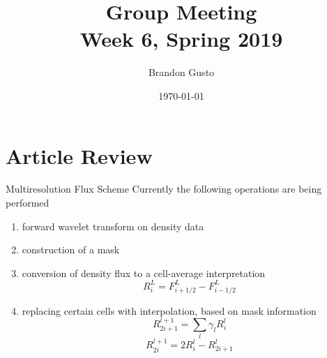 \documentclass{beamer}
\begin{document}
\section{Article Review}
\title{Group Meeting \\ Week 6, Spring 2019}
\author{Brandon Gusto} %
\date{\today}
\frame{\titlepage}

\begin{frame}{Multiresolution Flux Scheme}
  Currently the following operations are being performed
  \begin{enumerate}
    \item<2-> forward wavelet transform on density data
    \item<3-> construction of a mask
    \item<4-> conversion of density flux to a cell-average interpretation
      \[ R_{i}^{L} = F_{i+1/2}^{L} - F_{i-1/2}^{L} \]
    \item<5-> replacing certain cells with interpolation, based on mask information
      \[ R_{2i+1}^{l+1} = \sum_{l} \gamma_{l} R_{i}^{l} \]
      \[ R_{2i}^{l+1} = 2 R_{i}^{l} - R_{2i+1}^{l} \]
  \end{enumerate}
\end{frame}
\end{document}
